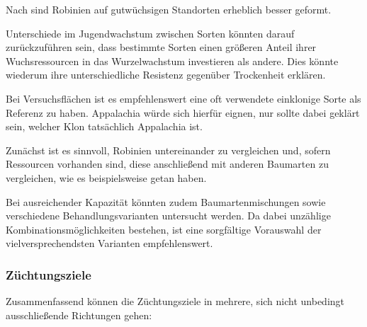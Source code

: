 \documentclass[twocolumn]{scrartcl}
\begin{document}
Nach \citet[S.~48]{erteld1952robinieErtrag} sind Robinien auf
gutwüchsigen Standorten erheblich besser geformt.

Unterschiede im Jugendwachstum zwischen Sorten könnten darauf
zurückzuführen sein, dass bestimmte Sorten einen größeren Anteil ihrer
Wuchsressourcen in das Wurzelwachstum investieren als andere. Dies
könnte wiederum ihre unterschiedliche Resistenz gegenüber Trockenheit
erklären.

Bei Versuchsflächen ist es empfehlenswert eine oft verwendete
einklonige Sorte als Referenz zu haben. Appalachia würde sich hierfür
eignen, nur sollte dabei geklärt sein, welcher Klon tatsächlich
Appalachia ist.

Zunächst ist es sinnvoll, Robinien untereinander zu vergleichen und,
sofern Ressourcen vorhanden sind, diese anschließend mit anderen
Baumarten zu vergleichen, wie es beispielsweise
\citet{Gruenewald2009robinie} getan haben.

Bei ausreichender Kapazität könnten zudem Baumartenmischungen sowie
verschiedene Behandlungsvarianten untersucht werden. Da dabei
unzählige Kombinationsmöglichkeiten bestehen, ist eine sorgfältige
Vorauswahl der vielversprechendsten Varianten empfehlenswert.

\subsubsection{Züchtungsziele}

Zusammenfassend können die Züchtungsziele in mehrere, sich nicht
unbedingt ausschließende Richtungen gehen:
\end{document}
